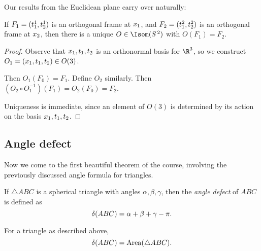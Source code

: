 Our results from the Euclidean plane carry over naturally:

\begin{corollary}
	If $F_1=(\tt_1^1,\tt_2^1)$ is an orthogonal frame at $\xx_1$, and $F_2=(\tt_1^2, \tt_2^2)$ is an orthogonal frame at $\xx_2$, then there is a unique $O\in\Isom(S^{\,2})$ with $O(F_1) = F_2$. %
\end{corollary}

\begin{proof}
	Observe that $\xx_1, \tt_1, \tt_2$ is an orthonormal basis for $\R^3$, so we construct $O_1 = (\xx_1,\tt_1,\tt_2) \in O(3)$. %

	Then $O_1(F_0)=F_1$. Define $O_2$ similarly. Then $(O_2 \circ O_1^{-1})(F_1) = O_2 (F_0) = F_2$.

	Uniqueness is immediate, since an element of $O(3)$ is determined by its action on the basis $\xx_1, \tt_1, \tt_2$. %
\end{proof}



	\pagebreak

\subsection{Angle defect} %
\label{sub:angle_defect}

Now we come to the first beautiful theorem of the course, involving the previously discussed angle formula for triangles.

\begin{definition}
	If $\triangle ABC$ is a spherical triangle with angles $\alpha,\beta,\gamma$, then the \emph{angle defect} of $ABC$ is defined as
	\begin{equation*}
		\defect(ABC) = \alpha+\beta+\gamma - \pi.
	\end{equation*} %
\end{definition}

\begin{theorem}
	For a triangle as described above,
	\begin{equation*}
		\defect(ABC) = \Area(\triangle ABC).
	\end{equation*}
\end{theorem}

